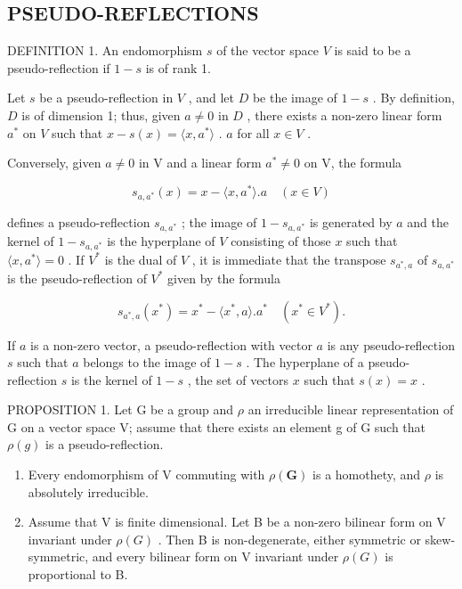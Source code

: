 \subsection{PSEUDO-REFLECTIONS}

DEFINITION 1. An endomorphism \(s\) of the vector space \(V\) is said to be a pseudo-reflection if \(1 - s\) is of rank 1.

Let \(s\) be a pseudo-reflection in \(V\) , and let \(D\) be the image of \(1 - s\) . By definition, \(D\) is of dimension 1; thus, given \(a \neq 0\) in \(D\) , there exists a non-zero linear form \(a^*\) on \(V\) such that \(x - s(x) = \langle x, a^* \rangle\) . \(a\) for all \(x \in V\) .

Conversely, given \(a \neq 0\) in V and a linear form \(a^{*} \neq 0\) on V, the formula

\[
s _ {a, a ^ {*}} (x) = x - \langle x, a ^ {*} \rangle . a \quad (x \in V)\tag{1}
\]

defines a pseudo-reflection \(s_{a,a^*}\) ; the image of \(1 - s_{a,a^*}\) is generated by \(a\) and the kernel of \(1 - s_{a,a^*}\) is the hyperplane of \(V\) consisting of those \(x\) such that \(\langle x, a^* \rangle = 0\) . If \(V^*\) is the dual of \(V\) , it is immediate that the transpose \(s_{a^*,a}\) of \(s_{a,a^*}\) is the pseudo-reflection of \(V^*\) given by the formula

\[
s _ {a ^ {*}, a} (x ^ {*}) = x ^ {*} - \langle x ^ {*}, a \rangle . a ^ {*} \quad (x ^ {*} \in V ^ {*}).\tag{2}
\]

If \(a\) is a non-zero vector, a pseudo-reflection with vector \(a\) is any pseudo-reflection \(s\) such that \(a\) belongs to the image of \(1 - s\) . The hyperplane of a pseudo-reflection \(s\) is the kernel of \(1 - s\) , the set of vectors \(x\) such that \(s(x) = x\) .

PROPOSITION 1. Let G be a group and \(\rho\) an irreducible linear representation of G on a vector space V; assume that there exists an element g of G such that \(\rho(g)\) is a pseudo-reflection.

\begin{enumerate}
\def\labelenumi{(\roman{enumi})}
\item
  Every endomorphism of V commuting with \(\rho(\mathbf{G})\) is a homothety, and \(\rho\) is absolutely irreducible.
\item
  Assume that V is finite dimensional. Let B be a non-zero bilinear form on V invariant under \(\rho(G)\) . Then B is non-degenerate, either symmetric or skew-symmetric, and every bilinear form on V invariant under \(\rho(G)\) is proportional to B.
\end{enumerate}

